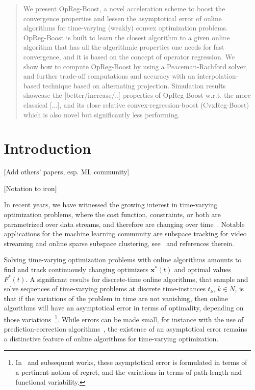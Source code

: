\documentclass{article}
\newcommand{\x}{\mathbold{x}}
\newcommand{\andrea}[1]{{\color{red}[#1]}}
\begin{document}
\printAffiliationsAndNotice{}  %

\begin{abstract}
We present OpReg-Boost, a novel acceleration scheme to boost the convergence properties and lessen the asymptotical error of online algorithms for time-varying (weakly) convex optimization problems. OpReg-Boost is built to learn the closest algorithm to a given online algorithm that has all the algorithmic properties one needs for fast convergence, and it is based on the concept of operator regression. We show how to compute OpReg-Boost by using a Peaceman-Rachford solver, and further trade-off computations and accuracy with an interpolation-based technique based on alternating projection. Simulation results showcase the \andrea{better/increase/..} properties of OpReg-Boost w.r.t. the more classical \andrea{...}, and its close relative convex-regression-boost (CvxReg-Boost) which is also novel but significantly less performing.  
\end{abstract}


\section{Introduction}\label{sec:introduction}

\andrea{Add others' papers, esp. ML community}

\andrea{Notation to iron}

In recent years, we have witnessed the growing interest in time-varying optimization problems, where the cost function, constraints, or both are parametrized over data streams, and therefore are changing over time~\cite{Jadbabaie2015, SPM}. Notable applications for the machine learning community are subspace tracking for video streaming and online sparse subspace clustering, see~\cite{Asif2014, Akhriev2020, SPM} and references therein. 

Solving time-varying optimization problems with online algorithms amounts to find and track continuously changing optimizers $\x^*(t)$ and optimal values $F^*(t)$. A significant results for discrete-time online algorithms, that sample and solve sequences of time-varying problems at discrete time-instances $t_k$, $k \in N$, is that if the variations of the problem in time are not vanishing, then online algorithms will have an asymptotical error in terms of optimality, depending on those variations~\cite{Besbes2013, Jadbabaie2015, SPM, NaLi2020}\footnote{
In~\cite{Jadbabaie2015} and subsequent works, these asymptotical error is formulated in terms of a pertinent notion of regret, and the variations in terms of path-length and functional variability.
}. While errors can be made small, for instance with the use of prediction-correction algorithms~\cite{Dontchev2013, simonetto_time-varying_2020}, the existence of an asymptotical error remains a distinctive feature of online algorithms for time-varying optimization. 
\end{document}
